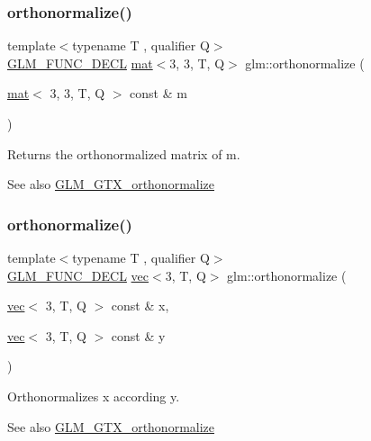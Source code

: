\subsubsection{\texorpdfstring{orthonormalize()}{orthonormalize()}\hspace{0.1cm}{\footnotesize\ttfamily [1/2]}}
{\footnotesize\ttfamily template$<$typename T , qualifier Q$>$ \\
\hyperlink{setup_8hpp_ab2d052de21a70539923e9bcbf6e83a51}{G\+L\+M\+\_\+\+F\+U\+N\+C\+\_\+\+D\+E\+CL} \hyperlink{structglm_1_1mat}{mat}$<$3, 3, T, Q$>$ glm\+::orthonormalize (\begin{DoxyParamCaption}\item[{\hyperlink{structglm_1_1mat}{mat}$<$ 3, 3, T, Q $>$ const \&}]{m }\end{DoxyParamCaption})}

Returns the orthonormalized matrix of m.

\begin{DoxySeeAlso}{See also}
\hyperlink{group__gtx__orthonormalize}{G\+L\+M\+\_\+\+G\+T\+X\+\_\+orthonormalize} 
\end{DoxySeeAlso}
\mbox{\label{group__gtx__orthonormalize_gac3bc7ef498815026bc3d361ae0b7138e}} 
\subsubsection{\texorpdfstring{orthonormalize()}{orthonormalize()}\hspace{0.1cm}{\footnotesize\ttfamily [2/2]}}
{\footnotesize\ttfamily template$<$typename T , qualifier Q$>$ \\
\hyperlink{setup_8hpp_ab2d052de21a70539923e9bcbf6e83a51}{G\+L\+M\+\_\+\+F\+U\+N\+C\+\_\+\+D\+E\+CL} \hyperlink{structglm_1_1vec}{vec}$<$3, T, Q$>$ glm\+::orthonormalize (\begin{DoxyParamCaption}\item[{\hyperlink{structglm_1_1vec}{vec}$<$ 3, T, Q $>$ const \&}]{x,  }\item[{\hyperlink{structglm_1_1vec}{vec}$<$ 3, T, Q $>$ const \&}]{y }\end{DoxyParamCaption})}

Orthonormalizes x according y.

\begin{DoxySeeAlso}{See also}
\hyperlink{group__gtx__orthonormalize}{G\+L\+M\+\_\+\+G\+T\+X\+\_\+orthonormalize} 
\end{DoxySeeAlso}
